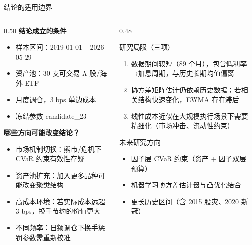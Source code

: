 \documentclass[aspectratio=169,11pt]{beamer}
\newcommand{\etfCount}{30}
\newcommand{\evalStartDate}{2019-01-01}
\newcommand{\evalEndDate}{2026-05-29}
\begin{document}
\begin{frame}{结论的适用边界}
  \begin{columns}[T]
    \begin{column}{0.50\textwidth}
      \textbf{结论成立的条件}
      \begin{itemize}
        \item 样本区间：\evalStartDate{} -- \evalEndDate
        \item 资产池：\etfCount{} 支可交易 A 股/海外 ETF
        \item 月度调仓，3 bps 单边成本
        \item 冻结参数 candidate\_23
      \end{itemize}
      \vspace{0.5em}
      \textbf{哪些方向可能改变结论？}
      \begin{itemize}
        \item \alert{市场机制切换}：熊市/危机下 CVaR 约束有效性存疑
        \item \alert{资产池扩充}：加入更多品种可能改变聚类结构
        \item \alert{高成本环境}：若实际成本远超 3 bps，换手节约的价值更大
        \item \alert{不同频率}：日频调仓下换手惩罚参数需重新校准
      \end{itemize}
    \end{column}
    \begin{column}{0.48\textwidth}
      \begin{alertblock}{研究局限（三项）}
        \begin{enumerate}
          \item 数据期间较短（89 个月），包含低利率→加息周期，与历史长期均值偏离
          \item 协方差矩阵估计仍依赖历史数据；若相关结构快速变化，EWMA 存在滞后
          \item 线性成本近似在大规模执行场景下需要精细化（市场冲击、流动性约束）
        \end{enumerate}
      \end{alertblock}
      \vspace{0.4em}
      \begin{block}{未来研究方向}
        \small
        \begin{itemize}
          \item 因子层 CVaR 约束（资产 + 因子双层预算）
          \item 机器学习协方差估计器与凸优化结合
          \item 更长历史区间（含 2015 股灾、2020 新冠）
        \end{itemize}
      \end{block}
    \end{column}
  \end{columns}
\end{frame}
\end{document}
